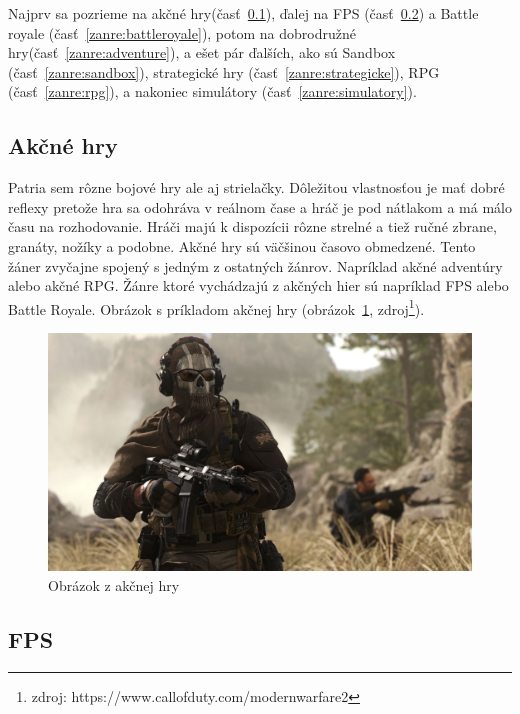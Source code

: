 \documentclass[10pt,oneside,slovak,a4paper]{article}
\begin{document}
Najprv sa pozrieme na akčné hry(časť~\ref{zanre:akcne}), ďalej na FPS (časť~\ref{zanre:fps}) a Battle royale (časť~\ref{zanre:battleroyale}), potom na dobrodružné hry(časť~\ref{zanre:adventure}), a ešet pár ďalších, ako sú Sandbox (časť~\ref{zanre:sandbox}), strategické hry (časť~\ref{zanre:strategicke}), RPG (časť~\ref{zanre:rpg}), a nakoniec simulátory (časť~\ref{zanre:simulatory}).

\subsection{Akčné hry} \label{zanre:akcne}

Patria sem rôzne bojové hry ale aj strielačky. Dôležitou vlastnosťou je mať dobré reflexy pretože hra sa odohráva v reálnom čase a hráč je pod nátlakom a má málo času na rozhodovanie. Hráči majú k dispozícii rôzne strelné a tiež ručné zbrane, granáty, nožíky a podobne. Akčné hry sú väčšinou časovo obmedzené. Tento žáner zvyčajne spojený s jedným z ostatných žánrov. Napríklad akčné adventúry alebo akčné RPG. Žánre ktoré vychádzajú z akčných hier sú napríklad FPS alebo Battle Royale. Obrázok s príkladom akčnej hry (obrázok~\ref{f:akcne}, zdroj\footnote{zdroj: https://www.callofduty.com/modernwarfare2}).

\begin{figure}[tbh]
\centering
\includegraphics[scale=0.1]{mw2.jpg}
\caption{Obrázok z akčnej hry}
\label{f:akcne}
\end{figure}



\subsection{FPS} \label{zanre:fps}
\end{document}
